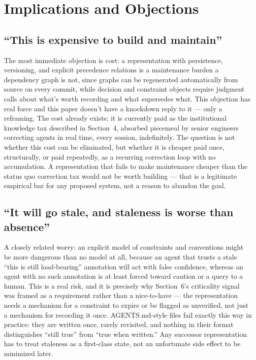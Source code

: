 \documentclass[11pt]{article}
\begin{document}
\section{Implications and Objections}

\subsection{``This is expensive to build and maintain''}

The most immediate objection is cost: a representation with persistence, versioning, and explicit precedence relations is a maintenance burden a dependency graph is not, since graphs can be regenerated automatically from source on every commit, while decision and constraint objects require judgment calls about what's worth recording and what supersedes what. This objection has real force and this paper doesn't have a knockdown reply to it --- only a reframing. The cost already exists; it is currently paid as the institutional knowledge tax described in Section~4, absorbed piecemeal by senior engineers correcting agents in real time, every session, indefinitely. The question is not whether this cost can be eliminated, but whether it is cheaper paid once, structurally, or paid repeatedly, as a recurring correction loop with no accumulation. A representation that fails to make maintenance cheaper than the status quo correction tax would not be worth building --- that is a legitimate empirical bar for any proposed system, not a reason to abandon the goal.

\subsection{``It will go stale, and staleness is worse than absence''}

A closely related worry: an explicit model of constraints and conventions might be more dangerous than no model at all, because an agent that trusts a stale ``this is still load-bearing'' annotation will act with false confidence, whereas an agent with no such annotation is at least forced toward caution or a query to a human. This is a real risk, and it is precisely why Section~6's criticality signal was framed as a requirement rather than a nice-to-have --- the representation needs a mechanism for a constraint to expire or be flagged as unverified, not just a mechanism for recording it once. AGENTS.md-style files fail exactly this way in practice: they are written once, rarely revisited, and nothing in their format distinguishes ``still true'' from ``true when written.'' Any successor representation has to treat staleness as a first-class state, not an unfortunate side effect to be minimized later.
\end{document}
